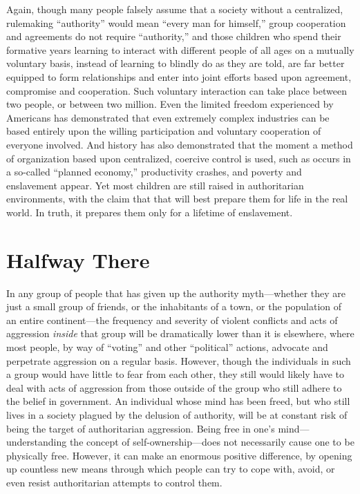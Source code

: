 \documentclass{book}
\begin{document}
Again, though many people falsely assume that a society without a centralized, rulemaking \enquote{authority} would mean \enquote{every man for himself,} group cooperation and agreements do not require \enquote{authority,} and those children who spend their formative years learning to interact with different people of all ages on a mutually voluntary basis, instead of learning to blindly do as they are told, are far better equipped to form relationships and enter into joint efforts based upon agreement, compromise and cooperation. Such voluntary interaction can take place between two people, or between two million. Even the limited freedom experienced by Americans has demonstrated that even extremely complex industries can be based entirely upon the willing participation and voluntary cooperation of everyone involved. And history has also demonstrated that the moment a method of organization based upon centralized, coercive control is used, such as occurs in a so-called \enquote{planned economy,} productivity crashes, and poverty and enslavement appear. Yet most children are still raised in authoritarian environments, with the claim that that will best prepare them for life in the real world. In truth, it prepares them only for a lifetime of enslavement.

\section{Halfway There}

In any group of people that has given up the authority myth---whether they are just a small group of friends, or the inhabitants of a town, or the population of an entire continent---the frequency and severity of violent conflicts and acts of aggression \emph{inside} that group will be dramatically lower than it is elsewhere, where most people, by way of \enquote{voting} and other \enquote{political} actions, advocate and perpetrate aggression on a regular basis. However, though the individuals in such a group would have little to fear from each other, they still would likely have to deal with acts of aggression from those outside of the group who still adhere to the belief in government. An individual whose mind has been freed, but who still lives in a society plagued by the delusion of authority, will be at constant risk of being the target of authoritarian aggression. Being free in one's mind---understanding the concept of self-ownership---does not necessarily cause one to be physically free. However, it can make an enormous positive difference, by opening up countless new means through which people can try to cope with, avoid, or even resist authoritarian attempts to control them.
\end{document}
